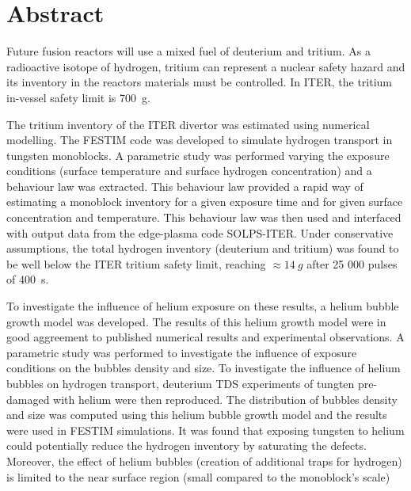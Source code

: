 \chapter*{Abstract}

Future fusion reactors will use a mixed fuel of deuterium and tritium.
As a radioactive isotope of hydrogen, tritium can represent a nuclear safety hazard and its inventory in the reactors materials must be controlled.
In ITER, the tritium in-vessel safety limit is \SI{700}{g}.

The tritium inventory of the ITER divertor was estimated using numerical modelling.
The FESTIM code was developed to simulate hydrogen transport in tungsten monoblocks.
A parametric study was performed varying the exposure conditions (surface temperature and surface hydrogen concentration) and a behaviour law was extracted.
This behaviour law provided a rapid way of estimating a monoblock inventory for a given exposure time and for given surface concentration and temperature.
This behaviour law was then used and interfaced with output data from the edge-plasma code SOLPS-ITER.
Under conservative assumptions, the total hydrogen inventory (deuterium and tritium) was found to be well below the ITER tritium safety limit, reaching $\approx \SI{14}{g}$ after 25 000 pulses of \SI{400}{s}.

To investigate the influence of helium exposure on these results, a helium bubble growth model was developed.
The results of this helium growth model were in good aggreement to published numerical results and experimental observations.
A parametric study was performed to investigate the influence of exposure conditions on the bubbles density and size.
To investigate the influence of helium bubbles on hydrogen transport, deuterium TDS experiments of tungten pre-damaged with helium were then reproduced.
The distribution of bubbles density and size was computed using this helium bubble growth model and the results were used in FESTIM simulations.
It was found that exposing tungsten to helium could potentially reduce the hydrogen inventory by saturating the defects.
Moreover, the effect of helium bubbles (creation of additional traps for hydrogen) is limited to the near surface region (small compared to the monoblock's scale)

